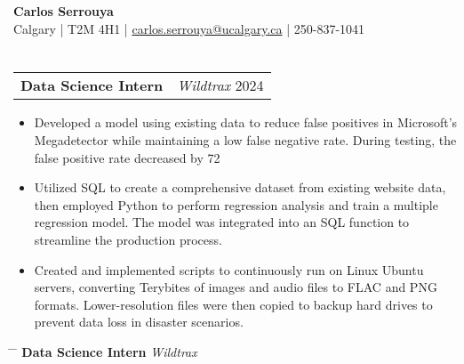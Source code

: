 \documentclass[a4paper,11pt]{article}
\begin{document}
\begin{center}
    {\LARGE \textbf{Carlos Serrouya}} \\
    Calgary | T2M 4H1 | \href{mailto:carlos.serrouya@ucalgary.ca}{carlos.serrouya@ucalgary.ca} | 250-837-1041 \\
\end{center}

\vspace{0.0cm}

\section*{%
}
\lipsum[1] %

\begin{tabularx}{\textwidth}{X r}
    \textbf{Data Science Intern} & \textit{Wildtrax} \hspace{1cm} 2024\\[-1ex]
\end{tabularx}

\begin{itemize}[leftmargin=0.5cm,itemsep=0.1ex]
	\item Developed a model using existing data to reduce false positives in Microsoft's Megadetector while maintaining a low false negative rate. During testing, the false positive rate decreased by 72%
	\item Utilized SQL to create a comprehensive dataset from existing website data, then employed Python to perform regression analysis and train a multiple regression model. The model was integrated into an SQL function to streamline the production process.
	\item Created and implemented scripts to continuously run on Linux Ubuntu servers, converting Terybites of images and audio files to FLAC and PNG formats. Lower-resolution files were then copied to backup hard drives to prevent data loss in disaster scenarios.
\end{itemize}

\vspace{0.5cm}

\begin{tabbing}
\hspace{5cm} \= \hspace{5cm} \= \kill
\textbf{Data Science Intern} \> \textit{Wildtrax} \\
\end{tabbing}
\end{document}
